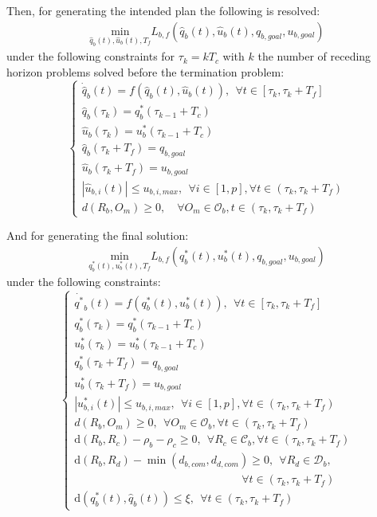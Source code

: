 \documentclass[eprint]{actapoly}
\begin{document}
Then, for generating the intended plan the following is resolved:
\begin{align}\label{eq:costsa}
\underset{\hat{q}_b(t),\hat{u}_b(t),T_f}{\mathrm{min}} L_{b,f}(\hat{q}_b(t), \hat{u}_b(t), q_{b,goal},u_{b,goal})
\end{align}
under the following constraints for $\tau_k = kT_c$ with $k$ the number of receding horizon
problems solved before the termination problem:
\begin{equation}\label{eq:constsa}
\left\lbrace\begin{array}{lcl}
    \dot{\hat{q}}_b(t) = f(\hat{q}_b(t),\hat{u}_b(t)),\ \ \forall t \in [\tau_{k}, \tau_{k}+T_f]\\
    \hat{q}_b(\tau_{k}) = q^*_{b}(\tau_{k-1}+T_c)\\
    \hat{u}_b(\tau_{k}) = u^*_{b}(\tau_{k-1}+T_c)\\
    \hat{q}_b(\tau_{k}+T_f) = q_{b,goal}\\
    \hat{u}_b(\tau_{k}+T_f) = u_{b,goal}\\
    |\hat{u}_{b,i}(t)| \leq u_{b,i,max},\ \ \forall i \in [1,p],\forall t \in (\tau_{k}, \tau_{k}+T_f)\\
    d(R_b, O_m) \geq 0,\quad \forall O_m \in \mathcal{O}_b, t \in (\tau_{k}, \tau_{k}+T_f)
\end{array}\right.
\end{equation}

And for generating the final solution:
\begin{align}\label{eq:cost}
\underset{q^*_b(t),u^*_b(t),T_f}{\mathrm{min}} L_{b,f}(q^*_b(t), u^*_b(t), q_{b,goal},u_{b,goal})
\end{align}
under the following constraints:
\begin{equation}\label{eq:const}
\left\lbrace\begin{array}{lcl}
    \dot{q^*}_b(t) = f(q^*_b(t),u^*_b(t)),\ \ \forall t \in [\tau_{k}, \tau_{k}+T_f]\\
    q^*_b(\tau_{k}) = q^*_{b}(\tau_{k-1}+T_c)\\
    u^*_b(\tau_{k}) = u^*_{b}(\tau_{k-1}+T_c)\\
    q^*_b(\tau_{k}+T_f) = q_{b,goal}\\
    u^*_b(\tau_{k}+T_f) = u_{b,goal}\\
    |u^*_{b,i}(t)| \leq u_{b,i,max},\ \ \forall i \in [1,p],\forall t \in (\tau_{k}, \tau_{k}+T_f)\\
    d(R_b, O_m) \geq 0,\ \ \forall O_m \in \mathcal{O}_b, \forall t \in (\tau_{k}, \tau_{k}+T_f)\\
    \mathrm{d}(R_b, R_c) - \rho_b - \rho_c \geq 0,\ \ \forall R_c \in \mathcal{C}_b, \forall t \in (\tau_{k}, \tau_{k}+T_f)\\
    \mathrm{d}(R_b, R_d) - \min(d_{b,com},d_{d,com}) \geq 0,\ \ \forall R_d \in \mathcal{D}_b,\\
    \quad \quad \quad \quad \quad \quad \quad \quad \quad \quad \quad \quad \quad \quad \quad \forall t \in (\tau_{k}, \tau_{k}+T_f)\\
    \mathrm{d}(q^*_b(t), \hat{q}_b(t)) \leq \xi,\ \ \forall t \in (\tau_{k}, \tau_{k}+T_f)
\end{array}\right.
\end{equation}
\end{document}
